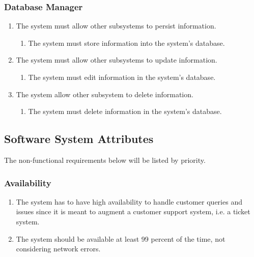 \documentclass[11pt]{article}
\begin{document}
\subsubsection{Database Manager}
\begin{enumerate}[label=R5.\arabic*.]
	\item The system must allow other subsystems to persist information.
	\begin{enumerate}[label*=\arabic*.]
		\item The system must store information into the system's database.
	\end{enumerate}
	\item The system must allow other subsystems to update information.
	\begin{enumerate}[label*=\arabic*.]
		\item The system must edit information in the system's database.
	\end{enumerate}
	\item The system allow other subsystem to delete information.
	\begin{enumerate}[label*=\arabic*.]
		\item The system must delete information in the system's database.
	\end{enumerate}
\end{enumerate}

\subsection{Software System Attributes}%

The non-functional requirements below will be listed by priority.

\subsubsection{Availability}
\begin{enumerate}
	\item The system has to have high availability to handle customer queries and issues since it is meant to augment a customer support system, i.e. a ticket system.
	\item The system should be available at least 99 percent of the time, not considering network errors.
\end{enumerate}
\end{document}
